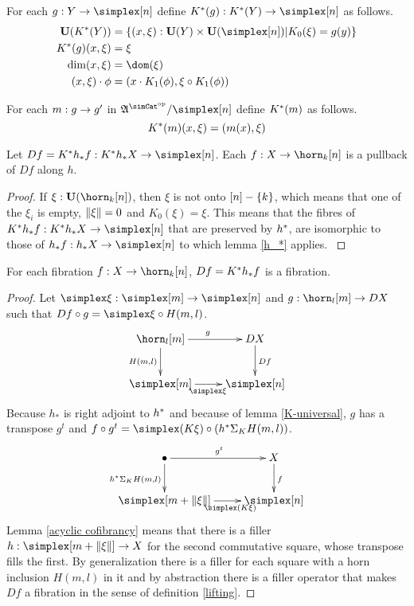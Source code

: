 \begin{definition} For each $g\of Y\to \simplex[n]$ define $K\ri(g)\of K\ri(Y) \to \simplex [n]$ as follows.
\begin{align*}
\base(K\ri(Y)) &= \set{(x,\xi)\of\base(Y)\times\base(\simplex[n])| K_0(\xi) = g(y) }\\
K\ri(g)(x,\xi) &= \xi\\
\dim(x,\xi) &= \dom(\xi)\\
(x,\xi)\cdot \phi &= (x\cdot K_1(\phi),\xi\circ K_1(\phi))
\end{align*}

For each $m: g\to g'$ in $\ambient\s/\simplex[n]$ define $K^*(m)$ as follows.
\[ K^*(m)(x,\xi) = (m(x),\xi) \]
\end{definition}

\begin{lemma} Let $Df = K\ri h_* f\of K\ri h_*X\to\simplex[n]$. Each $f\of X\to\horn_k[n]$ is a pullback of $Df$ along $h$. \label{f is pullback}\end{lemma}

\begin{proof}
If $\xi\of\base(\horn_k[n])$, then $\xi$ is not onto $[n]-\left\{k\right\}$, which means that one of the $\xi_i$ is empty, $\Vert \xi \Vert = 0$ and $K_0(\xi)=\xi$.
This means that the fibres of $K\ri h_* f\of K\ri h_*X\to\simplex[n]$ that are preserved by $h^*$, are isomorphic to those of $h_* f\of h_*X\to\simplex[n]$ to which lemma \ref{h_*} applies.
\label{descent pullback}
\end{proof}

\begin{lemma} For each fibration $f\of X\to\horn_k[n]$, $Df=K^* h_*f$ is a fibration. \label{descent2} \end{lemma}


\begin{proof} Let $\simplex\xi\of \simplex[m]\to\simplex[n]$ and $g\of \horn_l[m]\to DX$ such that $Df\circ g = \simplex\xi\circ H(m,l)$. 
\[
	\xymatrix{
		\horn_l[m]\ar[r]^g\ar[d]_{H(m,l)} & DX\ar[d]^{Df} \\
		\simplex[m]\ar[r]_{\simplex\xi} & \simplex[n]
	}	
\]
Because $h_*$ is right adjoint to $h^*$ and because of lemma \ref{K-universal}, $g$ has a transpose $g^t$ and $f\circ g^t = \simplex(K\xi)\circ (h\ri \depsum{K} H(m,l))$.
\[
	\xymatrix{
		\bullet\ar[r]^{g^t}\ar[d]_{h\ri \depsum K H(m,l)} & X\ar[d]^{f} \\
		\simplex[m+\norm\xi]\ar[r]_(.6){\simplex(K\xi)} & \simplex[n]
	}	
\]
Lemma \ref{acyclic cofibrancy} means that there is a filler $h\of \simplex[m+\norm\xi]\to X$ for the second commutative square, whose transpose fills the first.
By generalization there is a filler for each square with a horn inclusion $H(m,l)$ in it and by abstraction there is a filler operator that makes $Df$ a fibration in the sense of definition \ref{lifting}.
\end{proof}


